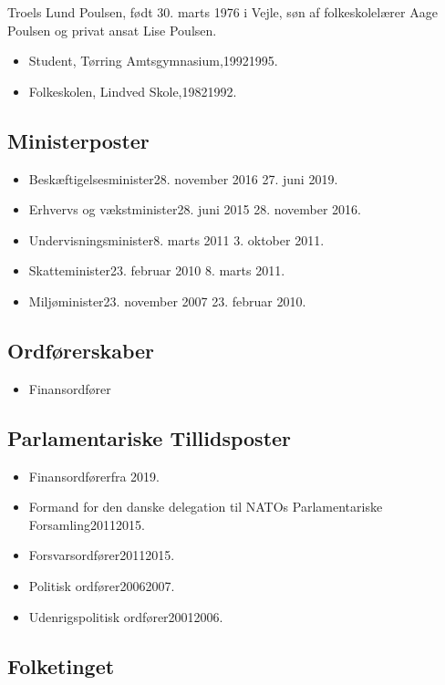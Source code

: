 \documentclass[11pt, a4paper]{awesome-cv}
\begin{document}
\makecvheader[R]
\makelettertitle
\begin{cvletter}
Troels Lund Poulsen, født 30. marts 1976 i Vejle, søn af folkeskolelærer Aage Poulsen og privat ansat Lise Poulsen.

\begin{itemize}
\item Student, Tørring Amtsgymnasium,19921995.
\item Folkeskolen, Lindved Skole,19821992.
\end{itemize}
\subsection*{Ministerposter}
\begin{itemize}
\item Beskæftigelsesminister28. november 2016  27. juni 2019.
\item Erhvervs og vækstminister28. juni 2015  28. november 2016.
\item Undervisningsminister8. marts 2011  3. oktober 2011.
\item Skatteminister23. februar 2010  8. marts 2011.
\item Miljøminister23. november 2007  23. februar 2010.
\end{itemize}
\subsection*{Ordførerskaber}
\begin{itemize}
\item Finansordfører
\end{itemize}
\subsection*{Parlamentariske Tillidsposter}
\begin{itemize}
\item Finansordførerfra 2019.
\item Formand for den danske delegation til NATOs Parlamentariske Forsamling20112015.
\item Forsvarsordfører20112015.
\item Politisk ordfører20062007.
\item Udenrigspolitisk ordfører20012006.
\end{itemize}
\subsection*{Folketinget}

\end{cvletter}
\end{document}
